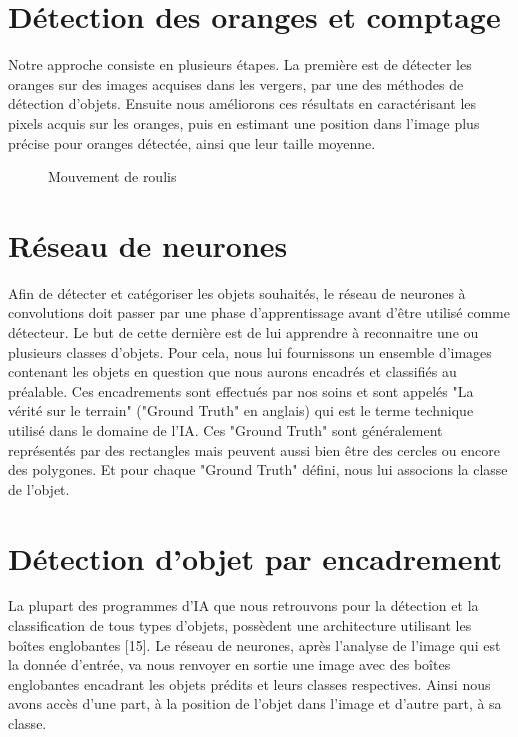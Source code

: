 \section{Détection des oranges et comptage}
Notre approche consiste en plusieurs étapes. La première est de détecter les oranges sur des images acquises dans les vergers, par une des méthodes de détection d’objets. Ensuite nous améliorons ces résultats en caractérisant les pixels acquis sur les oranges, puis en estimant une position  dans l’image plus précise pour oranges détectée, ainsi que leur taille moyenne.
	\begin{figure} [h]
	\begin{center}
		\caption{Mouvement de roulis}
	\end{center}
\end{figure}

\section{Réseau de neurones}

Afin de détecter et catégoriser les objets souhaités, le réseau de neurones à convolutions doit passer par une phase d’apprentissage avant d’être utilisé comme détecteur. Le but de cette dernière est de lui apprendre à reconnaitre une ou plusieurs classes d’objets. Pour cela, nous lui fournissons un ensemble d’images contenant les objets en question que nous aurons encadrés et classifiés au préalable. Ces encadrements sont effectués par nos soins et sont appelés "La vérité sur le terrain" ("Ground Truth" en anglais) qui est le terme technique utilisé dans le domaine de l’IA. Ces "Ground Truth" sont généralement représentés par des rectangles mais peuvent aussi bien être des cercles ou encore des polygones. Et pour chaque "Ground Truth" défini, nous lui associons la classe de l’objet.

\section{Détection d'objet par encadrement}
La plupart des programmes d’IA que nous retrouvons pour la détection et la classification de tous types d’objets, possèdent une architecture utilisant les boîtes englobantes [15]. Le réseau de neurones, après l’analyse de l’image qui est la donnée d’entrée, va nous renvoyer en sortie une image avec des boîtes englobantes encadrant les objets prédits et leurs classes respectives. Ainsi nous avons accès d’une part, à la position de l’objet dans l’image et d’autre part, à sa classe.




